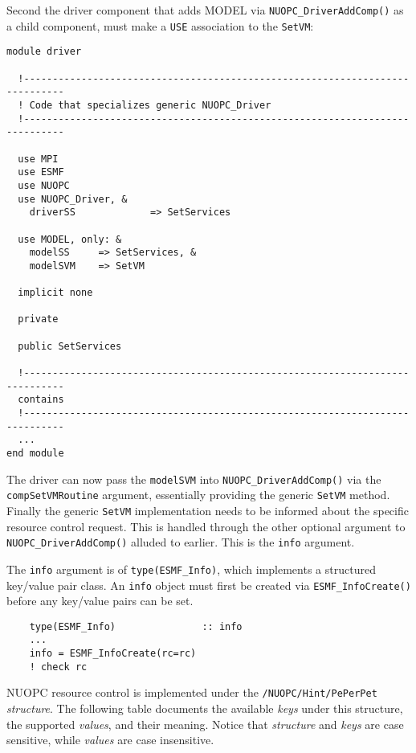 Second the driver component that adds MODEL via {\tt NUOPC\_DriverAddComp()} as a child component, must make a {\tt USE} association to the {\tt SetVM}:

\begin{verbatim}
module driver

  !-----------------------------------------------------------------------------
  ! Code that specializes generic NUOPC_Driver
  !-----------------------------------------------------------------------------

  use MPI
  use ESMF
  use NUOPC
  use NUOPC_Driver, &
    driverSS             => SetServices

  use MODEL, only: &
    modelSS     => SetServices, &
    modelSVM    => SetVM

  implicit none

  private

  public SetServices

  !-----------------------------------------------------------------------------
  contains
  !-----------------------------------------------------------------------------
  ...
end module
\end{verbatim}

The driver can now pass the {\tt modelSVM} into {\tt NUOPC\_DriverAddComp()} via the {\tt compSetVMRoutine} argument, essentially providing the generic {\tt SetVM} method. Finally the generic {\tt SetVM} implementation needs to be informed about the specific resource control request. This is handled through the other optional argument to {\tt NUOPC\_DriverAddComp()} alluded to earlier. This is the {\tt info} argument.

The {\tt info} argument is of {\tt type(ESMF\_Info)}, which implements a structured key/value pair class. An {\tt info} object must first be created via {\tt ESMF\_InfoCreate()} before any key/value pairs can be set.

\begin{verbatim}
    type(ESMF_Info)               :: info
    ...
    info = ESMF_InfoCreate(rc=rc)
    ! check rc
\end{verbatim}

NUOPC resource control is implemented under the {\tt /NUOPC/Hint/PePerPet} {\em structure}. The following table documents the available {\em keys} under this structure, the supported {\em values}, and their meaning. Notice that {\em structure} and {\em keys} are case sensitive, while {\em values} are case insensitive.

